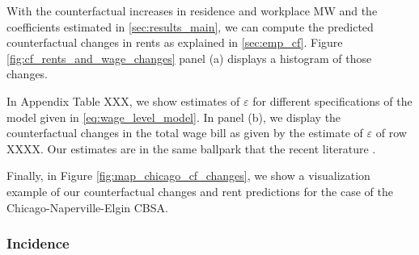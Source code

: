 With the counterfactual increases in residence and workplace MW and the 
coefficients estimated in \ref{sec:results_main}, we can compute the predicted 
counterfactual changes in rents as explained in \ref{sec:emp_cf}. Figure 
\ref{fig:cf_rents_and_wage_changes} panel (a) displays a histogram of those 
changes. 


In Appendix Table XXX, we show estimates of $\varepsilon$ for different specifications of 
the model given in \ref{eq:wage_level_model}. In panel (b), we display the counterfactual 
changes in the total wage bill as given by the estimate of $\varepsilon$ of row XXXX. Our 
estimates are in the same ballpark that the recent literature \parencite{CegnizEtAl2019}.


Finally, in Figure \ref{fig:map_chicago_cf_changes}, we show a visualization example 
of our counterfactual changes and rent predictions for the case of the 
Chicago-Naperville-Elgin CBSA. 


\subsubsection{Incidence}


